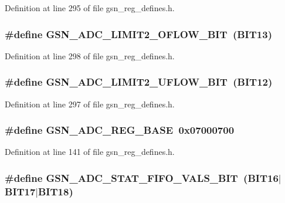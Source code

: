 Definition at line 295 of file gsn\_\-reg\_\-defines.h.

\hypertarget{a00546_ad5a6bba8a9b320947a75873b8fccce51}{
\subsubsection[{GSN\_\-ADC\_\-LIMIT2\_\-OFLOW\_\-BIT}]{\setlength{\rightskip}{0pt plus 5cm}\#define GSN\_\-ADC\_\-LIMIT2\_\-OFLOW\_\-BIT~(BIT13)}}
\label{a00546_ad5a6bba8a9b320947a75873b8fccce51}


Definition at line 298 of file gsn\_\-reg\_\-defines.h.

\hypertarget{a00546_aa3eb8893fab1df2c79cb4b8a6c569732}{
\subsubsection[{GSN\_\-ADC\_\-LIMIT2\_\-UFLOW\_\-BIT}]{\setlength{\rightskip}{0pt plus 5cm}\#define GSN\_\-ADC\_\-LIMIT2\_\-UFLOW\_\-BIT~(BIT12)}}
\label{a00546_aa3eb8893fab1df2c79cb4b8a6c569732}


Definition at line 297 of file gsn\_\-reg\_\-defines.h.

\hypertarget{a00546_a255cbdf01f6009c0b1e4ed28b0baef13}{
\subsubsection[{GSN\_\-ADC\_\-REG\_\-BASE}]{\setlength{\rightskip}{0pt plus 5cm}\#define GSN\_\-ADC\_\-REG\_\-BASE~0x07000700}}
\label{a00546_a255cbdf01f6009c0b1e4ed28b0baef13}


Definition at line 141 of file gsn\_\-reg\_\-defines.h.

\hypertarget{a00546_a06d7750cdbe9227276645ae05f6ccdd7}{
\subsubsection[{GSN\_\-ADC\_\-STAT\_\-FIFO\_\-VALS\_\-BIT}]{\setlength{\rightskip}{0pt plus 5cm}\#define GSN\_\-ADC\_\-STAT\_\-FIFO\_\-VALS\_\-BIT~(BIT16$|$BIT17$|$BIT18)}}
\label{a00546_a06d7750cdbe9227276645ae05f6ccdd7}


